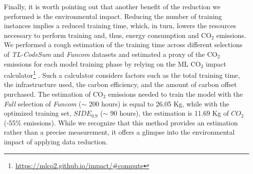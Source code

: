 Finally, it is worth pointing out that another benefit of the reduction we performed is the environmental impact. Reducing the number of training instances implies a reduced training time, which, in turn, lowers the resources necessary to perform training and, thus, energy consumption and CO$_2$ emissions.
We performed a rough estimation of the training time across different selections of \textit{TL-CodeSum} and \textit{Funcom} datasets and estimated a proxy of the CO$_2$ emissions for each model training phase by relying on the ML CO$_2$ impact calculator\footnote{\url{https://mlco2.github.io/impact/\#compute}} \cite{lacoste2019quantifying}. Such a calculator considers factors such as the total training time, the infrastructure used, the carbon efficiency, and the amount of carbon offset purchased. The estimation of CO$_{2}$ emissions needed to train the model with the \textit{Full} selection of \textit{Funcom} ($\sim$ 200 hours) is equal to 26.05 Kg, while with the optimized training set, \ie $SIDE_{0.9}$ ($\sim$ 90 hours), the estimation is 11.69 Kg of $CO_2$ (-55\% emissions).
While we recognize that this method provides an estimation rather than a precise measurement, it offers a glimpse into the environmental impact of applying data reduction.

